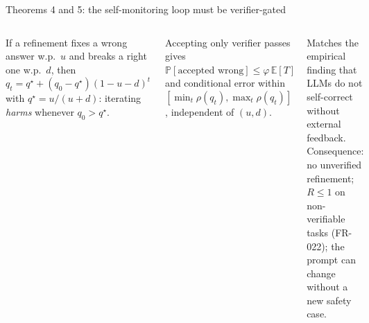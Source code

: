\documentclass[aspectratio=169,10pt]{beamer}
\renewcommand{\Pr}{\mathbb{P}}
\begin{document}
\begin{frame}{Theorems 4 and 5: the self-monitoring loop must be verifier-gated}
\begin{columns}[T]
\begin{theorem}
If a refinement fixes a wrong answer w.p.\ $u$ and breaks a right one w.p.\ $d$, then $q_t=q^\star+(q_0-q^\star)(1-u-d)^t$ with $q^\star=u/(u+d)$: iterating \emph{harms} whenever $q_0>q^\star$.
\end{theorem}
\begin{theorem}
Accepting only verifier passes gives $\Pr[\text{accepted wrong}]\le\varphi\,\mathbb E[T]$ and conditional error within $[\min_t\rho(q_t),\max_t\rho(q_t)]$, independent of $(u,d)$.
\end{theorem}
\scriptsize Matches the empirical finding that LLMs do not self-correct without external feedback. Consequence: no unverified refinement; $R\le1$ on non-verifiable tasks (FR-022); the prompt can change without a new safety case.
\end{columns}
\end{frame}
\end{document}
